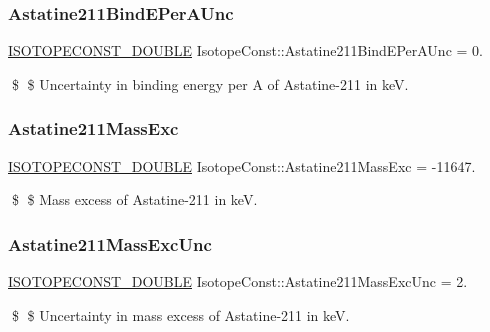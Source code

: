 \subsubsection{\texorpdfstring{Astatine211\+Bind\+E\+Per\+A\+Unc}{Astatine211BindEPerAUnc}}
{\footnotesize\ttfamily \mbox{\hyperlink{group___isotope_const-_macros_ga8f45a7272ce02c0b4c65c44636ed719a}{I\+S\+O\+T\+O\+P\+E\+C\+O\+N\+S\+T\+\_\+\+D\+O\+U\+B\+LE}} Isotope\+Const\+::\+Astatine211\+Bind\+E\+Per\+A\+Unc = 0.}

\$ \$ Uncertainty in binding energy per A of Astatine-\/211 in keV. \mbox{\label{group___isotope_const-_astatine-_at211_ga8064e0301968d68cf1965459c904f8b3}} 
\subsubsection{\texorpdfstring{Astatine211\+Mass\+Exc}{Astatine211MassExc}}
{\footnotesize\ttfamily \mbox{\hyperlink{group___isotope_const-_macros_ga8f45a7272ce02c0b4c65c44636ed719a}{I\+S\+O\+T\+O\+P\+E\+C\+O\+N\+S\+T\+\_\+\+D\+O\+U\+B\+LE}} Isotope\+Const\+::\+Astatine211\+Mass\+Exc = -\/11647.}

\$ \$ Mass excess of Astatine-\/211 in keV. \mbox{\label{group___isotope_const-_astatine-_at211_gaaafedeb794b6a3c28038502ceb1ca722}} 
\subsubsection{\texorpdfstring{Astatine211\+Mass\+Exc\+Unc}{Astatine211MassExcUnc}}
{\footnotesize\ttfamily \mbox{\hyperlink{group___isotope_const-_macros_ga8f45a7272ce02c0b4c65c44636ed719a}{I\+S\+O\+T\+O\+P\+E\+C\+O\+N\+S\+T\+\_\+\+D\+O\+U\+B\+LE}} Isotope\+Const\+::\+Astatine211\+Mass\+Exc\+Unc = 2.}

\$ \$ Uncertainty in mass excess of Astatine-\/211 in keV. \mbox{\label{group___isotope_const-_astatine-_at211_gab630fcc97cefcaf9b321e8bcbe703998}} 
